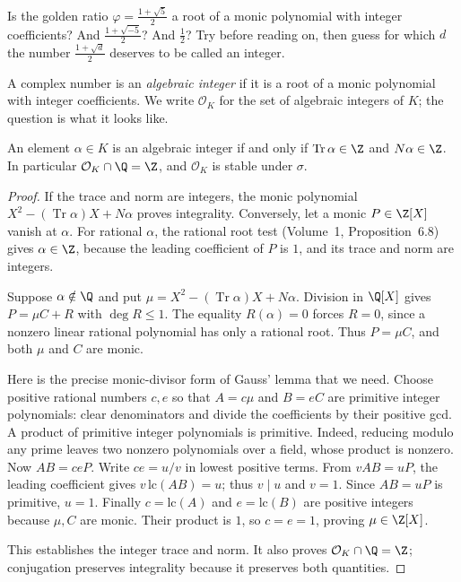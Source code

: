 \begin{think}
Is the golden ratio $\varphi=\frac{1+\sqrt5}2$ a root of a monic polynomial with integer coefficients? And $\frac{1+\sqrt{-5}}2$? And $\frac12$? Try before reading on, then guess for which $d$ the number $\frac{1+\sqrt d}2$ deserves to be called an integer.
\end{think}

A complex number is an \emph{algebraic integer} if it is a root of a monic polynomial with integer coefficients. We write $\mathcal O_K$ for the set of algebraic integers of $K$; the question is what it looks like.

\begin{proposition}\label{prop:quadint}
An element $\alpha\in K$ is an algebraic integer if and only if $\operatorname{Tr}\alpha\in\Z$ and $N\alpha\in\Z$. In particular $\mathcal O_K\cap\Q=\Z$, and $\mathcal O_K$ is stable under $\sigma$.
\end{proposition}
\begin{proof}
If the trace and norm are integers, the monic polynomial
$X^2-(\operatorname{Tr}\alpha)X+N\alpha$ proves integrality.
Conversely, let a monic $P\in\Z[X]$ vanish at $\alpha$.
For rational $\alpha$, the rational root test (Volume~1, Proposition~6.8) gives $\alpha\in\Z$, because the leading coefficient of $P$ is $1$,
and its trace and norm are integers.

Suppose $\alpha\notin\Q$ and put
$\mu=X^2-(\operatorname{Tr}\alpha)X+N\alpha$.
Division in $\Q[X]$ gives $P=\mu C+R$ with $\deg R\le1$.
The equality $R(\alpha)=0$ forces $R=0$, since a nonzero linear
rational polynomial has only a rational root. Thus $P=\mu C$, and
both $\mu$ and $C$ are monic.

Here is the precise monic-divisor form of Gauss' lemma that we need.
Choose positive rational numbers $c,e$ so that
$A=c\mu$ and $B=eC$ are primitive integer polynomials: clear
denominators and divide the coefficients by their positive gcd.
A product of primitive integer polynomials is primitive.
Indeed, reducing modulo any prime leaves two nonzero polynomials
over a field, whose product is nonzero. Now $AB=ceP$.
Write $ce=u/v$ in lowest positive terms. From $vAB=uP$,
the leading coefficient gives $v\,\mathrm{lc}(AB)=u$;
thus $v\mid u$ and $v=1$. Since $AB=uP$ is primitive,
$u=1$. Finally $c=\mathrm{lc}(A)$ and $e=\mathrm{lc}(B)$
are positive integers because $\mu,C$ are monic.
Their product is $1$, so $c=e=1$, proving $\mu\in\Z[X]$.

This establishes the integer trace and norm. It also proves
$\mathcal O_K\cap\Q=\Z$; conjugation preserves integrality
because it preserves both quantities.
\end{proof}

